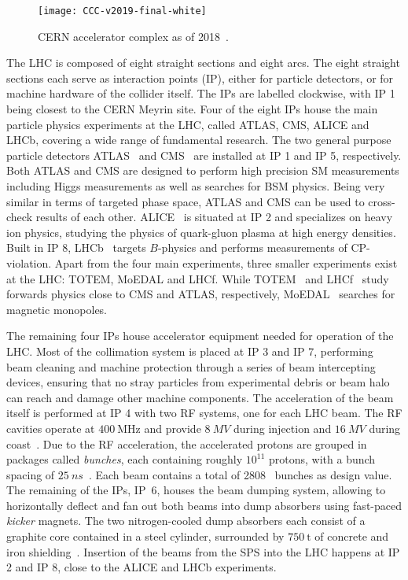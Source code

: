 \begin{figure}
	\centering    
	\texttt{[image: CCC-v2019-final-white]}
	\caption[CERN accelerator complex]{CERN accelerator complex as of 2018~\cite{Mobs:2684277}.}
	\label{fig:accelerator_complex}
\end{figure}

The LHC is composed of eight straight sections and eight arcs. The eight straight sections each serve as interaction points (IP), either for particle detectors, or for machine hardware of the collider itself. The IPs are labelled clockwise, with IP 1 being closest to the CERN Meyrin site. Four of the eight IPs house the main particle physics experiments at the LHC, called ATLAS, CMS, ALICE and LHCb, covering a wide range of fundamental research. The two general purpose particle detectors ATLAS~\cite{Aad:2008zzm} and CMS~\cite{Chatrchyan:2008aa} are installed at IP 1 and IP 5, respectively. Both ATLAS and CMS are designed to perform high precision SM measurements including Higgs measurements as well as searches for BSM physics. Being very similar in terms of targeted phase space, ATLAS and CMS can be used to cross-check results of each other. ALICE~\cite{Aamodt:2008zz} is situated at IP 2 and specializes on heavy ion physics, studying the physics of quark-gluon plasma at high energy densities. Built in IP 8, LHCb~\cite{Alves:2008zz} targets $B$-physics and performs measurements of CP-violation. Apart from the four main experiments, three smaller experiments exist at the LHC: TOTEM, MoEDAL and LHCf. While TOTEM~\cite{Anelli:2008zza} and LHCf~\cite{Adriani:2006jd} study forwards physics close to CMS and ATLAS, respectively, MoEDAL~\cite{Pinfold:2009oia} searches for magnetic monopoles.

The remaining four IPs house accelerator equipment needed for operation of the LHC. Most of the collimation system is placed at IP 3 and IP 7, performing beam cleaning and machine protection through a series of beam intercepting devices, ensuring that no stray particles from experimental debris or beam halo can reach and damage other machine components. The acceleration of the beam itself is performed at IP 4 with two RF systems, one for each LHC beam. The RF cavities operate at $\SI{400}{\MHz}$ and provide $\SI{8}{MV}$ during injection and $\SI{16}{MV}$ during coast~\cite{Evans:1129806}. Due to the RF acceleration, the accelerated protons are grouped in packages called \textit{bunches}, each containing roughly $10^{11}$ protons, with a bunch spacing of $\SI{25}{ns}$~\cite{Evans:1129806}. Each beam contains a total of 2808~\cite{Evans:1129806} bunches as design value. The remaining of the IPs, IP~6, houses the beam dumping system, allowing to horizontally deflect and fan out both beams into dump absorbers using fast-paced \textit{kicker} magnets. The two nitrogen-cooled dump absorbers each consist of a graphite core contained in a steel cylinder, surrounded by $\SI{750}{\tonne}$ of concrete and iron shielding~\cite{Bruning:782076}. Insertion of the beams from the SPS into the LHC happens at IP 2 and IP 8, close to the ALICE and LHCb experiments.

